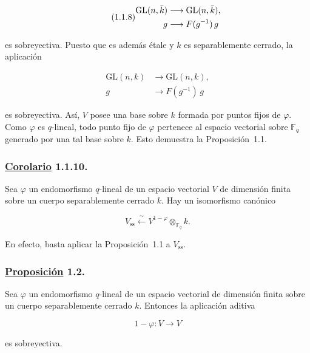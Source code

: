 \begin{equation}\tag{1.1.8}
\begin{aligned}
\sisi{\mathrm{Gl}}{\mathrm{GL}}(n,\bar k)&\longrightarrow\sisi{\mathrm{Gl}}{\mathrm{GL}}(n,\bar k),\\
g&\longrightarrow F(g^{-1})\,g
\end{aligned}
\end{equation}

\pageoriginale

es sobreyectiva. Puesto que es además étale y $k$ es separablemente
cerrado, la aplicación

\begin{equation}\tag{1.1.9}
\begin{aligned}
\mathrm{GL}(n,k)&\longrightarrow\mathrm{GL}(n,k),\\
g&\longrightarrow F(g^{-1})\,g
\end{aligned}
\end{equation}

es sobreyectiva. Así, $V$ posee una base sobre $k$ formada por puntos fijos
de $\varphi$. Como $\varphi$ es $q$-lineal, todo punto fijo de $\varphi$
pertenece al espacio vectorial sobre $\mathbb F_q$ generado por una tal base
sobre $k$. Esto demuestra la Proposición~1.1.

\subsubsection*{\underline{Corolario} 1.1.10.}
Sea $\varphi$ un endomorfismo $q$-lineal de un espacio vectorial $V$ de
dimensión finita sobre un cuerpo separablemente cerrado $k$. Hay un
isomorfismo canónico

\begin{equation}\tag{1.1.11}
V_{\mathrm{ss}}\xleftarrow{\ \sim\ }
V^{1-\varphi}\otimes_{\mathbb F_q}k.
\end{equation}

En efecto, basta aplicar la Proposición~1.1 a $V_{\mathrm{ss}}$.

\subsubsection*{\underline{Proposición} 1.2.}
Sea $\varphi$ un endomorfismo $q$-lineal de un espacio vectorial de
dimensión finita sobre un cuerpo separablemente cerrado $k$. Entonces la
aplicación aditiva

\[
1-\varphi:V\longrightarrow V
\]

es sobreyectiva.

